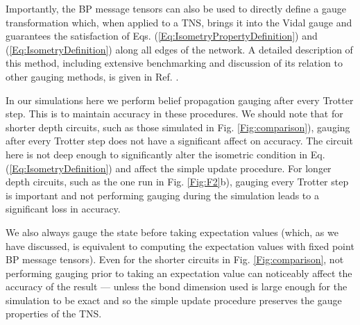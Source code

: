 \documentclass[%
 superscriptaddress,
 amsmath,amssymb,
 prx, nofootinbib,
]{revtex4-2}
\begin{document}
Importantly, the BP message tensors can also be used to directly define a gauge transformation which, when applied to a TNS, brings it into the Vidal gauge and guarantees the satisfaction of Eqs. (\ref{Eq:IsometryPropertyDefinition}) and (\ref{Eq:IsometryDefinition}) along all edges of the network. 
A detailed description of this method, including extensive benchmarking and discussion of its relation to other gauging methods, is given in Ref. \cite{TindallGauging2023}. 

In our simulations here we perform belief propagation gauging after every Trotter step. This is to maintain accuracy in these procedures. We should note that for shorter depth circuits, such as those simulated in Fig. \ref{Fig:comparison}), gauging after every Trotter step does not have a significant affect on accuracy. The circuit here is not deep enough to significantly alter the isometric condition in Eq. (\ref{Eq:IsometryDefinition}) and affect the simple update procedure. For longer depth circuits, such as the one run in Fig. \ref{Fig:F2}b), gauging every Trotter step is important and not performing gauging during the simulation leads to a significant loss in accuracy. 

We also always gauge the state before taking expectation values (which, as we have discussed, is equivalent to computing the expectation values with fixed point BP message tensors). Even for the shorter circuits in Fig. \ref{Fig:comparison}, not performing gauging prior to taking an expectation value can noticeably affect the accuracy of the result --- unless the bond dimension used is large enough for the simulation to be exact and so the simple update procedure preserves the gauge properties of the TNS.
\end{document}
